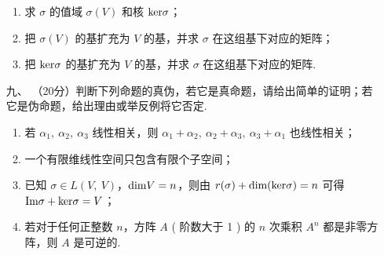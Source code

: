\begin{enumerate}
\begin{enumerate}[label=(\arabic*)]
        \item 求 $\sigma$ 的值域 $\sigma(V)$ 和核 $\textup{ker}\sigma$；

        \item 把 $\sigma(V)$ 的基扩充为 $V$ 的基，并求 $\sigma$ 在这组基下对应的矩阵；

        \item 把 $\textup{ker}\sigma$ 的基扩充为 $V$ 的基，并求 $\sigma$ 在这组基下对应的矩阵.
    \end{enumerate}
	\item[九、]（20分）判断下列命题的真伪，若它是真命题，请给出简单的证明；若它是伪命题，给出理由或举反例将它否定.
    \begin{enumerate}[label=(\arabic*)]
        \item 若 $\alpha_1,\ \alpha_2,\ \alpha_3$ 线性相关，则 $\alpha_1+\alpha_2,\ \alpha_2+\alpha_3,\ \alpha_3+\alpha_1$ 也线性相关；

        \item 一个有限维线性空间只包含有限个子空间；

        \item 已知 $\sigma \in L(V,\ V)$，$\textup{dim}V=n$，则由 $r(\sigma)+\textup{dim(ker}\sigma)=n$ 可得$\textup{Im}\sigma+\textup{ker}\sigma=V$；

        \item 若对于任何正整数 $n$，方阵 $A$ ( 阶数大于 1 ) 的 $n$ 次乘积 $A^n$ 都是非零方阵，则 $A$ 是可逆的.
    \end{enumerate}
\end{enumerate}

\clearpage
